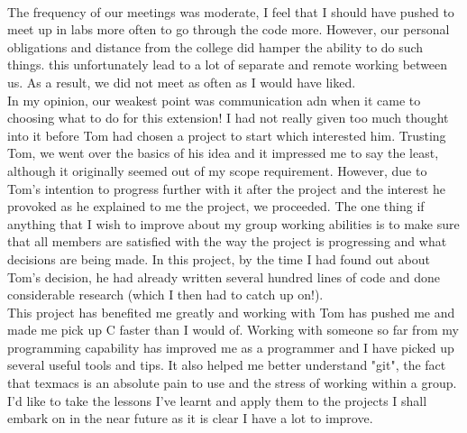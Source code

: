 \documentclass[11pt]{article}
\begin{document}
\\
\indent The frequency of our meetings was moderate, I feel that I should have pushed to meet up in labs more often to go through the code more. However, our personal obligations and distance from the college did hamper the ability to do such things. this unfortunately lead to a lot of separate and remote working between us. As a result, we did not meet as often as I would have liked.
\\
\indent In my opinion, our weakest point was communication adn when it came to choosing what to do for this extension! I had not really given too much thought into it before Tom had chosen a project to start which interested him. Trusting Tom, we went over the basics of his idea and it impressed me to say the least, although it originally seemed out of my scope requirement. However, due to Tom's intention to progress further with it after the project and the interest he provoked as he explained to me the project, we proceeded. 
The one thing if anything that I wish to improve about my group working abilities is to make sure that all members are satisfied with the way the project is progressing and what decisions are being made. In this project, by the time I had found out about Tom's decision, he had already written several hundred lines of code and done considerable research (which I then had to catch up on!).
\\
\indent This project has benefited me greatly and working with Tom has pushed me and made me pick up C faster than I would of. Working with someone so far from my programming capability has improved me as a programmer and I have picked up several useful tools and tips. It also helped me better understand "git", the fact that texmacs is an absolute pain to use and the stress of working within a group. I'd like to take the lessons I've learnt and apply them to the projects I shall embark on in the near future as it is clear I have a lot to improve.
\end{document}
